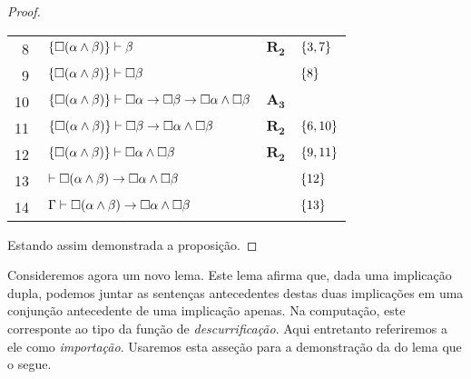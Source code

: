 \begin{tcolorbox}[enhanced jigsaw, breakable, sharp corners, colframe=black, colback=white, boxrule=0.5pt, left=1.5mm, right=1.5mm, top=1.5mm, bottom=1.5mm]
\begin{lemma}
\begin{proof}
\begin{xltabular}{\textwidth}{r | X l l}
            \scriptsize{\phantom{0}8}\phantom{ } & $\ \set{\nec(\alpha\wedge\beta)}\vdash\beta$                                              & $\hyperref[modal.rule.2]{\mathbf{R_2}}$        & $\left\{3,7\right\}$\\[\rowskip]
            \scriptsize{\phantom{0}9}\phantom{ } & $\ \set{\nec(\alpha\wedge\beta)}\vdash\nec\beta$                                          &                       & $\left\{8\right\}$\\[\rowskip]
            \scriptsize{10}\phantom{ }           & $\ \set{\nec(\alpha\wedge\beta)}\vdash\nec\alpha\to\nec\beta\to\nec\alpha\wedge\nec\beta$ & $\hyperref[modal.axiom.3]{\mathbf{A_3}}$       & \\[\rowskip]
            \scriptsize{11}\phantom{ }           & $\ \set{\nec(\alpha\wedge\beta)}\vdash\nec\beta\to\nec\alpha\wedge\nec\beta$              & $\hyperref[modal.rule.2]{\mathbf{R_2}}$        & $\left\{6,10\right\}$\\[\rowskip]
            \scriptsize{12}\phantom{ }           & $\ \set{\nec(\alpha\wedge\beta)}\vdash\nec\alpha\wedge\nec\beta$                          & $\hyperref[modal.rule.2]{\mathbf{R_2}}$        & $\left\{9,11\right\}$\\[\rowskip]
            \scriptsize{13}\phantom{ }           & $\ \vdash\nec(\alpha\wedge\beta)\to\nec\alpha\wedge\nec\beta$                             &                            & $\left\{12\right\}$\\[\rowskip]
            \scriptsize{14}\phantom{ }           & $\ \Gamma\vdash\nec(\alpha\wedge\beta)\to\nec\alpha\wedge\nec\beta$                       &                            & $\left\{13\right\}$
        \end{xltabular}
        \normalsize

        \vspace{0.5\baselineskip}
        Estando assim demonstrada a proposição.
        \end{proof}
    \end{lemma}
\end{tcolorbox}

\vspace{.5\baselineskip}
Consideremos agora um novo lema.
Este lema afirma que, dada uma implicação dupla, podemos juntar as sentenças antecedentes destas duas implicações em uma conjunção antecedente de uma implicação apenas.
Na computação, este corresponte ao tipo da função de \emph{descurrificação}.
Aqui entretanto referiremos a ele como \emph{importação}.
Usaremos esta asseção para a demonstração da do lema que o segue.

